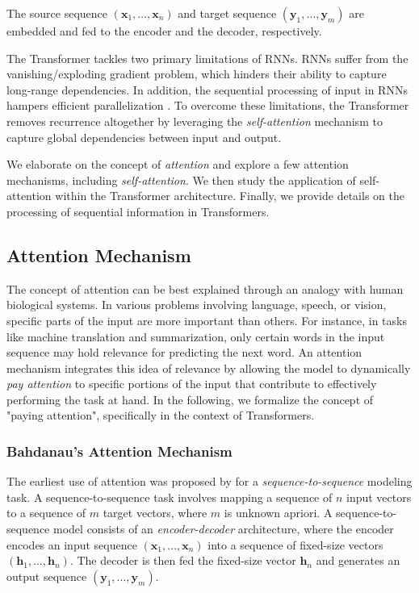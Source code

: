 \noindent The source sequence $(\bm{x}_1, \ldots, \bm{x}_n)$ and target sequence $(\bm{y}_1, \ldots, \bm{y}_m)$ are embedded and fed to the encoder and the decoder, respectively.

The Transformer tackles two primary limitations of \acp{RNN}. \acp{RNN} suffer from the vanishing/exploding gradient problem, which hinders their ability to capture long-range dependencies. In addition, the sequential processing of input in \acp{RNN} hampers efficient parallelization \citep{vaswani2017attention}. To overcome these limitations, the Transformer removes recurrence altogether by leveraging the \textit{self-attention} mechanism to capture global dependencies between input and output. 

We elaborate on the concept of \textit{attention} and explore a few attention mechanisms, including \textit{self-attention}. We then study the application of self-attention within the Transformer architecture. Finally, we provide details on the processing of sequential information in Transformers.

\subsection{Attention Mechanism} 

The concept of attention can be best explained through an analogy with human biological systems. In various problems involving language, speech, or vision, specific parts of the input are more important than others. For instance, in tasks like machine translation and summarization, only certain words in the input sequence may hold relevance for predicting the next word. An attention mechanism integrates this idea of relevance by allowing the model to dynamically \textit{pay attention} to specific portions of the input that contribute to effectively performing the task at hand. In the following, we formalize the concept of "paying attention", specifically in the context of Transformers.

\subsubsection{Bahdanau's Attention Mechanism} 

The earliest use of attention was proposed by \citet{bahdanau2014neural} for a \textit{sequence-to-sequence} modeling task. A sequence-to-sequence task involves mapping a sequence of $n$ input vectors to a sequence of $m$ target vectors, where $m$ is unknown apriori. A sequence-to-sequence model \citep{sutskever2014sequence} consists of an \textit{encoder-decoder} architecture, where the encoder encodes an input sequence $(\bm{x}_1, \ldots, \bm{x}_n)$ into a sequence of fixed-size vectors $(\bm{h}_1, \ldots, \bm{h}_n)$. The decoder is then fed the fixed-size vector $\bm{h}_n$ and generates an output sequence $(\bm{y}_1, \ldots, \bm{y}_m)$.

